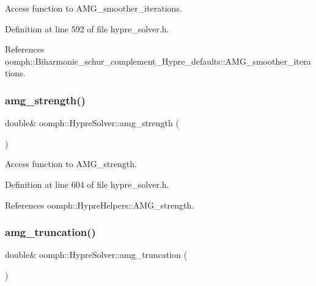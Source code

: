 Access function to A\+M\+G\+\_\+smoother\+\_\+iterations. 



Definition at line 592 of file hypre\+\_\+solver.\+h.



References oomph\+::\+Biharmonic\+\_\+schur\+\_\+complement\+\_\+\+Hypre\+\_\+defaults\+::\+A\+M\+G\+\_\+smoother\+\_\+iterations.

\mbox{\label{classoomph_1_1HypreSolver_af49d2527d5d66f349d970f2f161a61a2}} 
\subsubsection{\texorpdfstring{amg\+\_\+strength()}{amg\_strength()}}
{\footnotesize\ttfamily double\& oomph\+::\+Hypre\+Solver\+::amg\+\_\+strength (\begin{DoxyParamCaption}{ }\end{DoxyParamCaption})\hspace{0.3cm}{\ttfamily [inline]}}



Access function to A\+M\+G\+\_\+strength. 



Definition at line 604 of file hypre\+\_\+solver.\+h.



References oomph\+::\+Hypre\+Helpers\+::\+A\+M\+G\+\_\+strength.

\mbox{\label{classoomph_1_1HypreSolver_ad591a3eb6ba46fef20f027887aeac30b}} 
\subsubsection{\texorpdfstring{amg\+\_\+truncation()}{amg\_truncation()}}
{\footnotesize\ttfamily double\& oomph\+::\+Hypre\+Solver\+::amg\+\_\+truncation (\begin{DoxyParamCaption}{ }\end{DoxyParamCaption})\hspace{0.3cm}{\ttfamily [inline]}}



